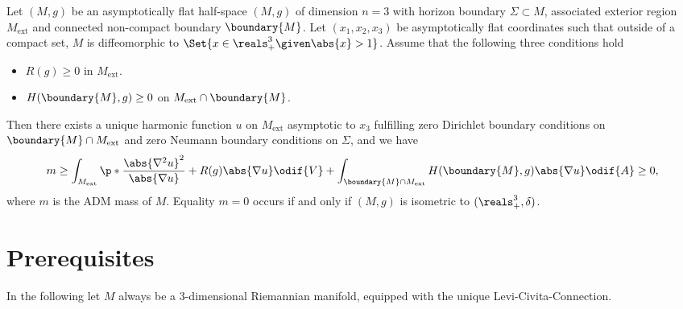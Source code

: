 \documentclass[titlepage,numbers=noenddot,headinclude,oneside,%
footinclude=true,cleardoublepage=empty,%
BCOR=5mm,paper=a4,fontsize=11pt,%
english,%
]{scrartcl}
\newcommand{\ext}{\operatorname{ext}} %
\begin{document}
\begin{theorem}
    Let \( (M,g) \) be an asymptotically flat half-space \( (M,g) \) of dimension \( n=3 \) with horizon boundary \( \Sigma\subset M \), associated exterior region \( M_{\ext} \) and connected non-compact boundary \( \boundary{M} \). Let \( (x_1,x_2,x_3) \) be asymptotically flat coordinates such that outside of a compact set, \( M \) is diffeomorphic to \( \Set{x\in \reals^3_+\given \abs{x}>1} \). Assume that the following three conditions hold
    \begin{itemize}
        \item \( R(g)\geq 0 \) in \( M_{\ext} \).
        \item \( H(\boundary{M},g)\geq 0 \) on \( M_{\ext}\cap \boundary{M} \).
    \end{itemize}
    Then there exists a unique harmonic function \( u \) on \( M_{\ext} \) asymptotic to \( x_3 \) fulfilling zero Dirichlet boundary conditions on \( \boundary{M}\cap M_{\ext} \) and zero Neumann boundary conditions on \( \Sigma \), and we have
    \begin{equation*}
        m\geq \int_{M_{\ext}}\p*{\frac{\abs{\nabla^2 u}^2}{\abs{\nabla u}}+R(g)\abs{\nabla u}}\odif{V}+\int_{\boundary{M}\cap M_{\ext}}H(\boundary{M},g)\abs{\nabla u}\odif{A}\geq 0,
    \end{equation*}
    where \( m \) is the ADM mass of \( M \). Equality \( m=0 \) occurs if and only if \( (M,g) \) is isometric to \( (\reals^3_+,\delta) \). 
     
\end{theorem}



\section{Prerequisites}

In the following let \( M \) always be a 3-dimensional Riemannian manifold, equipped with the unique Levi-Civita-Connection.
\end{document}
